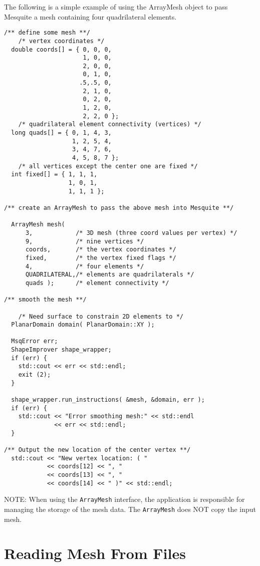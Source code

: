 The following is a simple example of using the ArrayMesh object to pass
Mesquite a mesh containing four quadrilateral elements.
\begin{lstlisting}
/** define some mesh **/
    /* vertex coordinates */
  double coords[] = { 0, 0, 0,
                      1, 0, 0,
                      2, 0, 0,
                      0, 1, 0,
                     .5,.5, 0,
                      2, 1, 0,
                      0, 2, 0,
                      1, 2, 0,
                      2, 2, 0 };
    /* quadrilateral element connectivity (vertices) */
  long quads[] = { 0, 1, 4, 3,
                   1, 2, 5, 4,
                   3, 4, 7, 6,
                   4, 5, 8, 7 };
    /* all vertices except the center one are fixed */
  int fixed[] = { 1, 1, 1,
                  1, 0, 1,
                  1, 1, 1 };
  
/** create an ArrayMesh to pass the above mesh into Mesquite **/
  
  ArrayMesh mesh( 
      3,            /* 3D mesh (three coord values per vertex) */
      9,            /* nine vertices */
      coords,       /* the vertex coordinates */ 
      fixed,        /* the vertex fixed flags */
      4,            /* four elements */
      QUADRILATERAL,/* elements are quadrilaterals */
      quads );      /* element connectivity */
  
/** smooth the mesh **/
  
    /* Need surface to constrain 2D elements to */
  PlanarDomain domain( PlanarDomain::XY );

  MsqError err;
  ShapeImprover shape_wrapper;
  if (err) {
    std::cout << err << std::endl;
    exit (2);
  }
  
  shape_wrapper.run_instructions( &mesh, &domain, err );
  if (err) {
    std::cout << "Error smoothing mesh:" << std::endl
              << err << std::endl;
  }
  
/** Output the new location of the center vertex **/
  std::cout << "New vertex location: ( "
            << coords[12] << ", " 
            << coords[13] << ", " 
            << coords[14] << " )" << std::endl;
\end{lstlisting}

NOTE:  When using the \texttt{ArrayMesh} interface, the application is responsible for managing the storage of the mesh data.  The \texttt{ArrayMesh}
 does NOT copy the input mesh.  

 
\section{Reading Mesh From Files} \label{sec:meshFiles}

